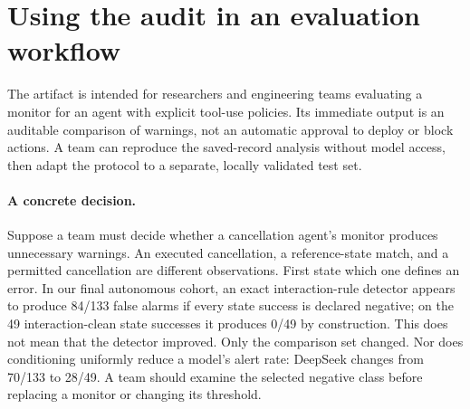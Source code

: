 \section{Using the audit in an evaluation workflow}
\label{sec:use}
The artifact is intended for researchers and engineering teams evaluating a monitor for an agent with explicit tool-use policies. Its immediate output is an auditable comparison of warnings, not an automatic approval to deploy or block actions. A team can reproduce the saved-record analysis without model access, then adapt the protocol to a separate, locally validated test set.

\paragraph{A concrete decision.}
Suppose a team must decide whether a cancellation agent's monitor produces unnecessary warnings. An executed cancellation, a reference-state match, and a permitted cancellation are different observations. First state which one defines an error. In our final autonomous cohort, an exact interaction-rule detector appears to produce 84/133 false alarms if every state success is declared negative; on the 49 interaction-clean state successes it produces 0/49 by construction. This does not mean that the detector improved. Only the comparison set changed. Nor does conditioning uniformly reduce a model's alert rate: DeepSeek changes from 70/133 to 28/49. A team should examine the selected negative class before replacing a monitor or changing its threshold.

